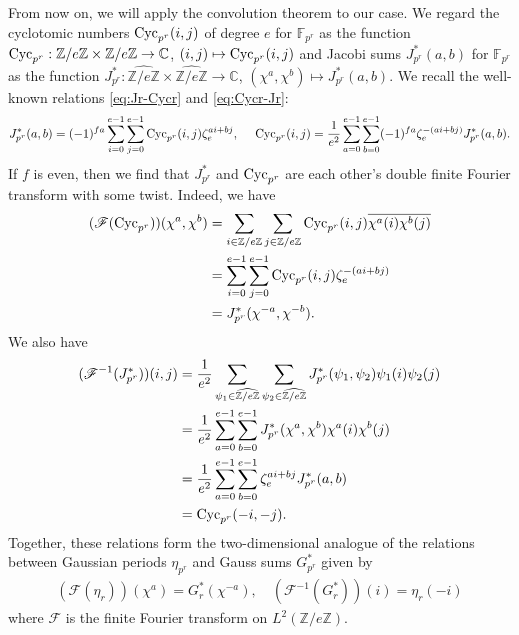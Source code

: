 \documentclass[a4paper, 11pt]{amsart}
\newcommand{\Z}{\mathbb Z}
\newcommand{\C}{\mathbb C}
\newcommand{\F}{\mathbb F}
\theoremstyle{plain}
\theoremstyle{definition}
\numberwithin{equation}{section}
\begin{document}
From now on, we will apply the convolution theorem to our case.
We regard the cyclotomic numbers ${\rm Cyc}_{p^r}(i,j)$ of degree $e$ for $\F_{p^r}$ as the function ${\rm Cyc}_{p^r}:\Z/e\Z \times \Z/e\Z \rightarrow \C$, 
$(i,j)\mapsto {\rm Cyc}_{p^r}(i,j)$ 
and Jacobi sums $J_{p^r}^{\ast}(a,b)$ for $\F_{p^r}$ as the function 
$J_{p^r}^{\ast}:\widehat{\Z/e\Z} \times \widehat{\Z/e\Z} \rightarrow \C$, $(\chi^a, \chi^b) \mapsto J_{p^r}^{\ast}(a,b)$. 
We recall the well-known relations \eqref{eq:Jr-Cycr} and \eqref{eq:Cycr-Jr}: 
\begin{align*}
J_{p^r}^{\ast}(a,b)=(-1)^{fa}\sum_{i=0}^{e-1} \sum_{j=0}^{e-1} {\rm Cyc}_{p^r}(i,j) \zeta_e^{ai+bj},\ \quad
{\rm Cyc}_{p^r}(i,j)=\frac{1}{e^2}\sum_{a=0}^{e-1} \sum_{b=0}^{e-1} (-1)^{fa} \zeta_e^{-(ai+bj)}J_{p^r}^{\ast}(a,b).
\end{align*}
If $f$ is even, 
then we find that $J_{p^r}^{\ast}$ and ${\rm Cyc}_{p^r}$
are each other's double finite Fourier transform with some twist. 
Indeed, we have
\begin{align*}
(\mathscr{F}({\rm Cyc}_{p^r}))(\chi^a, \chi^b)
&=\sum_{i \in \Z/e\Z} \sum_{j \in \Z/e\Z} {\rm Cyc}_{p^r}(i,j) \overline{\chi^a(i)\chi^b(j)}\\
&=\sum_{i=0}^{e-1} \sum_{j=0}^{e-1} {\rm Cyc}_{p^r}(i,j) \zeta_e^{-(ai+bj)}\\
&=J_{p^r}^{\ast}(\chi^{-a},\chi^{-b}).\\
\end{align*}
We also have
\begin{align*}
(\mathscr{F}^{-1}(J_{p^r}^{\ast}))(i,j)
&=\frac{1}{e^2}\sum_{\psi_1 \in \widehat{\Z/e\Z}} \sum_{\psi_2 \in \widehat{\Z/e\Z}}J_{p^r}^{\ast}(\psi_1,\psi_2) \psi_1(i)\psi_2(j)\\
&=\frac{1}{e^2}\sum_{a=0}^{e-1} \sum_{b=0}^{e-1}J_{p^r}^{\ast}(\chi^a,\chi^b) \chi^a(i)\chi^b(j)\\
&=\frac{1}{e^2}\sum_{a=0}^{e-1} \sum_{b=0}^{e-1} \zeta_e^{ai+bj}J_{p^r}^{\ast}(a,b)\\
&={\rm Cyc}_{p^r}(-i,-j).
\end{align*}
Together, these relations form the two-dimensional analogue of the relations between Gaussian periods $\eta_{p^r}$
and Gauss sums $G^*_{p^r}$ given by
\begin{align*}
(\mathscr{F}(\eta_r))(\chi^a)=G_{r}^{\ast}(\chi^{-a}), \quad
(\mathscr{F}^{-1}(G_{r}^{\ast}))(i)=\eta_{r}(-i)
\end{align*}
where $\mathscr{F}$ is the finite Fourier transform on $L^2(\Z/e\Z)$.
\end{document}
